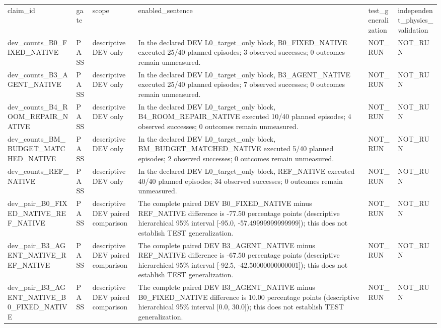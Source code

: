 \begin{tabular}{llllll}
claim\_id & gate & scope & enabled\_sentence & test\_generalization & independent\_physics\_validation \\
dev\_counts\_B0\_FIXED\_NATIVE & PASS & descriptive DEV only & In the declared DEV L0\_target\_only block, B0\_FIXED\_NATIVE executed 25/40 planned episodes; 3 observed successes; 0 outcomes remain unmeasured. & NOT\_RUN & NOT\_RUN \\
dev\_counts\_B3\_AGENT\_NATIVE & PASS & descriptive DEV only & In the declared DEV L0\_target\_only block, B3\_AGENT\_NATIVE executed 25/40 planned episodes; 7 observed successes; 0 outcomes remain unmeasured. & NOT\_RUN & NOT\_RUN \\
dev\_counts\_B4\_ROOM\_REPAIR\_NATIVE & PASS & descriptive DEV only & In the declared DEV L0\_target\_only block, B4\_ROOM\_REPAIR\_NATIVE executed 10/40 planned episodes; 4 observed successes; 0 outcomes remain unmeasured. & NOT\_RUN & NOT\_RUN \\
dev\_counts\_BM\_BUDGET\_MATCHED\_NATIVE & PASS & descriptive DEV only & In the declared DEV L0\_target\_only block, BM\_BUDGET\_MATCHED\_NATIVE executed 5/40 planned episodes; 2 observed successes; 0 outcomes remain unmeasured. & NOT\_RUN & NOT\_RUN \\
dev\_counts\_REF\_NATIVE & PASS & descriptive DEV only & In the declared DEV L0\_target\_only block, REF\_NATIVE executed 40/40 planned episodes; 34 observed successes; 0 outcomes remain unmeasured. & NOT\_RUN & NOT\_RUN \\
dev\_pair\_B0\_FIXED\_NATIVE\_REF\_NATIVE & PASS & descriptive DEV paired comparison & The complete paired DEV B0\_FIXED\_NATIVE minus REF\_NATIVE difference is -77.50 percentage points (descriptive hierarchical 95\% interval [-95.0, -57.49999999999999]); this does not establish TEST generalization. & NOT\_RUN & NOT\_RUN \\
dev\_pair\_B3\_AGENT\_NATIVE\_REF\_NATIVE & PASS & descriptive DEV paired comparison & The complete paired DEV B3\_AGENT\_NATIVE minus REF\_NATIVE difference is -67.50 percentage points (descriptive hierarchical 95\% interval [-92.5, -42.50000000000001]); this does not establish TEST generalization. & NOT\_RUN & NOT\_RUN \\
dev\_pair\_B3\_AGENT\_NATIVE\_B0\_FIXED\_NATIVE & PASS & descriptive DEV paired comparison & The complete paired DEV B3\_AGENT\_NATIVE minus B0\_FIXED\_NATIVE difference is 10.00 percentage points (descriptive hierarchical 95\% interval [0.0, 30.0]); this does not establish TEST generalization. & NOT\_RUN & NOT\_RUN \\

\end{tabular}
